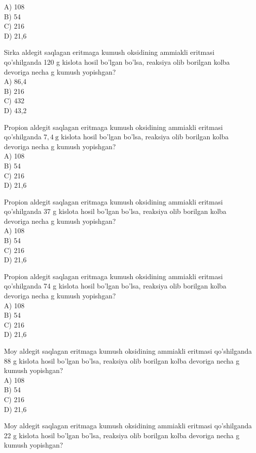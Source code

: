 A) 108\\
B) 54\\
C) 216\\
D) 21,6
  \item Sirka aldegit saqlagan eritmaga kumush oksidining ammiakli eritmasi\\
qo'shilganda 120 g kislota hosil bo'lgan bo'lsa, reaksiya olib borilgan kolba devoriga necha g kumush yopishgan?\\
A) 86,4\\
B) 216\\
C) 432\\
D) 43,2
  \item Propion aldegit saqlagan eritmaga kumush oksidining ammiakli eritmasi qo'shilganda $7,4 \mathrm{~g}$ kislota hosil bo'lgan bo'lsa, reaksiya olib borilgan kolba devoriga necha g kumush yopishgan?\\
A) 108\\
B) 54\\
C) 216\\
D) 21,6
  \item Propion aldegit saqlagan eritmaga kumush oksidining ammiakli eritmasi qo'shilganda 37 g kislota hosil bo'lgan bo'lsa, reaksiya olib borilgan kolba devoriga necha g kumush yopishgan?\\
A) 108\\
B) 54\\
C) 216\\
D) 21,6
  \item Propion aldegit saqlagan eritmaga kumush oksidining ammiakli eritmasi qo'shilganda 74 g kislota hosil bo'lgan bo'lsa, reaksiya olib borilgan kolba devoriga necha g kumush yopishgan?\\
A) 108\\
B) 54\\
C) 216\\
D) 21,6
  \item Moy aldegit saqlagan eritmaga kumush oksidining ammiakli eritmasi qo'shilganda 88 g kislota hosil bo'lgan bo'lsa, reaksiya olib borilgan kolba devoriga necha g kumush yopishgan?\\
A) 108\\
B) 54\\
C) 216\\
D) 21,6
  \item Moy aldegit saqlagan eritmaga kumush oksidining ammiakli eritmasi qo'shilganda 22 g kislota hosil bo'lgan bo'lsa, reaksiya olib borilgan kolba devoriga necha g kumush yopishgan?\\
